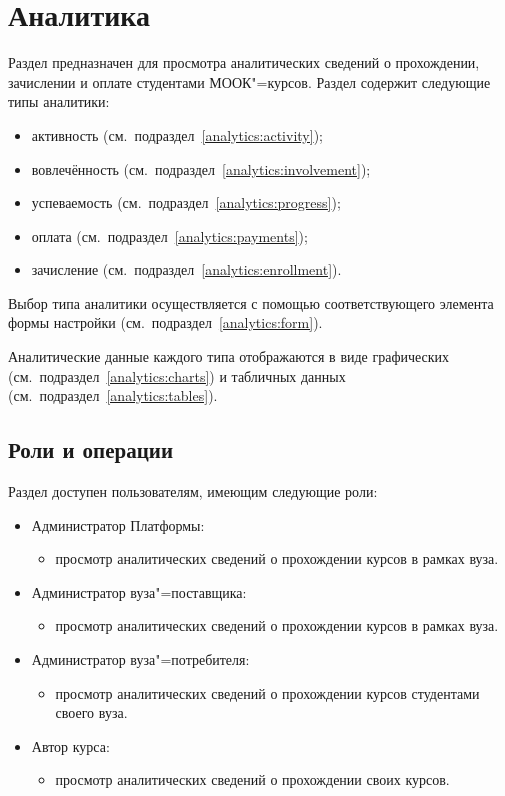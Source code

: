 \graphicspath{{images/analytics/}}
\section{Аналитика}

Раздел  предназначен для просмотра аналитических сведений о прохождении, 
зачислении и оплате студентами МООК"=курсов. Раздел  содержит следующие типы
аналитики:
\begin{itemize}
	\item активность (см.\ подраздел~\ref{analytics:activity});
	\item вовлечённость (см.\ подраздел~\ref{analytics:involvement});
	\item успеваемость (см.\ подраздел~\ref{analytics:progress});
	\item оплата (см.\ подраздел~\ref{analytics:payments});
	\item зачисление (см.\ подраздел~\ref{analytics:enrollment}).
\end{itemize}

Выбор типа аналитики осуществляется с помощью соответствующего элемента формы настройки 
(см.\ подраздел~\ref{analytics:form}).

Аналитические данные каждого типа отображаются в виде графических 
(см.\ подраздел~\ref{analytics:charts}) и табличных данных (см.\ подраздел~\ref{analytics:tables}). 

\subsection{Роли и операции}
Раздел доступен пользователям, имеющим следующие роли:
\begin{itemize}
	\item Администратор Платформы:
	\begin{itemize}
		\item просмотр аналитических сведений о прохождении курсов в рамках вуза.
	\end{itemize}
	\item Администратор вуза"=поставщика:
	\begin{itemize}
		\item просмотр аналитических сведений о прохождении курсов в рамках вуза.
	\end{itemize}
	\item Администратор вуза"=потребителя:
	\begin{itemize}
		\item просмотр аналитических сведений о прохождении курсов студентами своего вуза.
	\end{itemize}
	\item Автор курса:
	\begin{itemize}
		\item просмотр аналитических сведений о прохождении своих курсов.
	\end{itemize}
\end{itemize}

